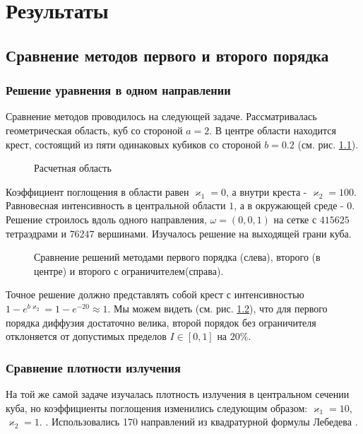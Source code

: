\chapter{Результаты}

\section{Сравнение методов первого и второго порядка}
\subsection{Решение уравнения в одном направлении}
Сравнение методов проводилось на следующей задаче. Рассматривалась
геометрическая область, куб со стороной $a = 2$. В центре области находится
крест, состоящий из пяти одинаковых кубиков со стороной $b = 0.2$ (см. рис. \ref{fig:6}).
\begin{figure}[ht!]
\caption{Расчетная область}
\label{fig:6}
\end{figure}
Коэффи\-циент поглощения в области равен $\varkappa_1=0$, а внутри креста - $\varkappa_2 = 100$. Равновесная интенсивность в центральной области $1$, а в окружающей среде - $0$. Решение строилось вдоль одного направления, $\omega = (0,0,1)$ на сетке с $415625$ тетраэдрами и $76247$ вершинами. Изучалось решение на выходящей грани куба. 
\begin{figure}[ht!]
\caption{Сравнение решений методами первого порядка (слева), второго (в центре) и второго с ограничителем(справа).}
\label{fig:7}
\end{figure}

Точное решение должно представлять собой крест с интенсивностью $1 -
e^{b\varkappa_2} = 1-e^{-20} \approx 1$. Мы можем видеть (см. рис. \ref{fig:7}), что для первого порядка диффузия достаточно велика, второй порядок без ограничителя отклоняется от допустимых пределов $I \in [0, 1]$ на $20 \%$.
\subsection{Сравнение плотности излучения}
На той же самой задаче изучалась плотность излучения в центральном сечении куба, но коэффициенты поглощения изменились следующим образом: $\varkappa_1 = 10$, $\varkappa_2 = 1$. . Использовались 170 направлений из квадратурной формулы Лебедева \cite{lebedev_1999}. 

